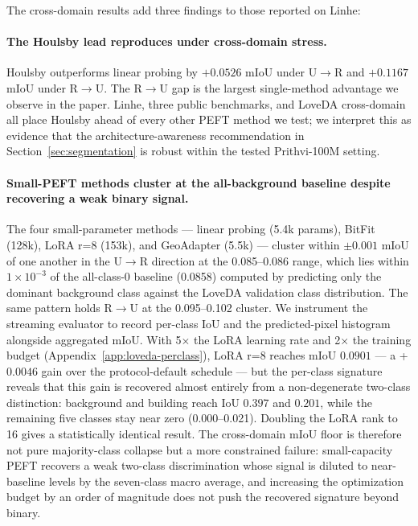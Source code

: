 \documentclass[11pt]{article}
\begin{document}
The cross-domain results add three findings to those reported on Linhe:

\paragraph{The Houlsby lead reproduces under cross-domain stress.} Houlsby outperforms linear probing by $+0.0526$ mIoU under U$\rightarrow$R and $+0.1167$ mIoU under R$\rightarrow$U. The R$\rightarrow$U gap is the largest single-method advantage we observe in the paper. Linhe, three public benchmarks, and LoveDA cross-domain all place Houlsby ahead of every other PEFT method we test; we interpret this as evidence that the architecture-awareness recommendation in Section~\ref{sec:segmentation} is robust within the tested Prithvi-100M setting.

\paragraph{Small-PEFT methods cluster at the all-background baseline despite recovering a weak binary signal.} The four small-parameter methods --- linear probing (5.4k params), BitFit (128k), LoRA r=8 (153k), and GeoAdapter (5.5k) --- cluster within $\pm 0.001$ mIoU of one another in the U$\rightarrow$R direction at the 0.085--0.086 range, which lies within $1 \times 10^{-3}$ of the all-class-0 baseline (0.0858) computed by predicting only the dominant background class against the LoveDA validation class distribution. The same pattern holds R$\rightarrow$U at the 0.095--0.102 cluster. We instrument the streaming evaluator to record per-class IoU and the predicted-pixel histogram alongside aggregated mIoU. With 5$\times$ the LoRA learning rate and 2$\times$ the training budget (Appendix~\ref{app:loveda-perclass}), LoRA r=8 reaches mIoU $0.0901$ --- a +$0.0046$ gain over the protocol-default schedule --- but the per-class signature reveals that this gain is recovered almost entirely from a non-degenerate two-class distinction: background and building reach IoU $0.397$ and $0.201$, while the remaining five classes stay near zero (0.000--0.021). Doubling the LoRA rank to 16 gives a statistically identical result. The cross-domain mIoU floor is therefore not pure majority-class collapse but a more constrained failure: small-capacity PEFT recovers a weak two-class discrimination whose signal is diluted to near-baseline levels by the seven-class macro average, and increasing the optimization budget by an order of magnitude does not push the recovered signature beyond binary.
\end{document}
